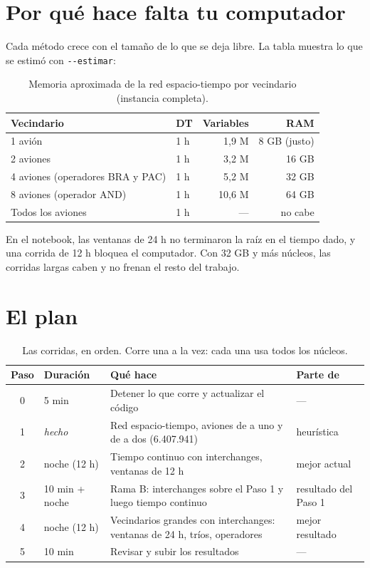 \documentclass[11pt,a4paper]{article}
\begin{document}
\section{Por qué hace falta tu computador}

Cada método crece con el tamaño de lo que se deja libre. La tabla muestra lo que se estimó con \texttt{-{}-estimar}:

\begin{table}[h]
\centering
\caption{Memoria aproximada de la red espacio-tiempo por vecindario (instancia completa).}
\begin{tabular}{llrr}
\toprule
Vecindario & DT & Variables & RAM \\
\midrule
1 avión & 1 h & 1,9 M & 8 GB (justo) \\
2 aviones & 1 h & 3,2 M & 16 GB \\
4 aviones (operadores BRA y PAC) & 1 h & 5,2 M & 32 GB \\
8 aviones (operador AND) & 1 h & 10,6 M & 64 GB \\
Todos los aviones & 1 h & --- & no cabe \\
\bottomrule
\end{tabular}
\end{table}

En el notebook, las ventanas de 24 h no terminaron la raíz en el tiempo dado, y una corrida de 12 h bloquea el computador. Con 32 GB y más núcleos, las corridas largas caben y no frenan el resto del trabajo.

\section{El plan}

\begin{table}[h]
\centering
\caption{Las corridas, en orden. Corre una a la vez: cada una usa todos los núcleos.}
\begin{tabularx}{\textwidth}{clXl}
\toprule
Paso & Duración & Qué hace & Parte de \\
\midrule
0 & 5 min & Detener lo que corre y actualizar el código & --- \\
1 & \textit{hecho} & Red espacio-tiempo, aviones de a uno y de a dos (6.407.941) & heurística \\
2 & noche (12 h) & Tiempo continuo con interchanges, ventanas de 12 h & mejor actual \\
3 & 10 min + noche & Rama B: interchanges sobre el Paso 1 y luego tiempo continuo & resultado del Paso 1 \\
4 & noche (12 h) & Vecindarios grandes con interchanges: ventanas de 24 h, tríos, operadores & mejor resultado \\
5 & 10 min & Revisar y subir los resultados & --- \\
\bottomrule
\end{tabularx}
\end{table}
\end{document}
